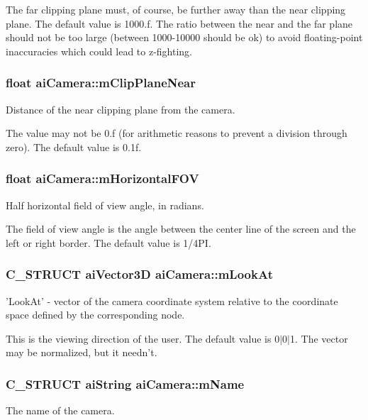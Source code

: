 The far clipping plane must, of course, be further away than the near clipping plane. The default value is 1000.\-f. The ratio between the near and the far plane should not be too large (between 1000-\/10000 should be ok) to avoid floating-\/point inaccuracies which could lead to z-\/fighting. \hypertarget{structai_camera_a720e8c94c036dcefe4b13cc1c69c521e}{
\subsubsection[{m\-Clip\-Plane\-Near}]{\setlength{\rightskip}{0pt plus 5cm}float ai\-Camera\-::m\-Clip\-Plane\-Near}}\label{structai_camera_a720e8c94c036dcefe4b13cc1c69c521e}
Distance of the near clipping plane from the camera.

The value may not be 0.\-f (for arithmetic reasons to prevent a division through zero). The default value is 0.\-1f. \hypertarget{structai_camera_adcdea73ece19ea0a9068f5544ec23592}{
\subsubsection[{m\-Horizontal\-F\-O\-V}]{\setlength{\rightskip}{0pt plus 5cm}float ai\-Camera\-::m\-Horizontal\-F\-O\-V}}\label{structai_camera_adcdea73ece19ea0a9068f5544ec23592}
Half horizontal field of view angle, in radians.

The field of view angle is the angle between the center line of the screen and the left or right border. The default value is 1/4\-P\-I. \hypertarget{structai_camera_af9463249ac870e030fa435b1186cef23}{
\subsubsection[{m\-Look\-At}]{\setlength{\rightskip}{0pt plus 5cm}C\-\_\-\-S\-T\-R\-U\-C\-T {\bf ai\-Vector3\-D} ai\-Camera\-::m\-Look\-At}}\label{structai_camera_af9463249ac870e030fa435b1186cef23}
'Look\-At' -\/ vector of the camera coordinate system relative to the coordinate space defined by the corresponding node.

This is the viewing direction of the user. The default value is 0$\vert$0$\vert$1. The vector may be normalized, but it needn't. \hypertarget{structai_camera_aa6a5fe5e04b3db1b23f69eb9910c6816}{
\subsubsection[{m\-Name}]{\setlength{\rightskip}{0pt plus 5cm}C\-\_\-\-S\-T\-R\-U\-C\-T {\bf ai\-String} ai\-Camera\-::m\-Name}}\label{structai_camera_aa6a5fe5e04b3db1b23f69eb9910c6816}
The name of the camera.

